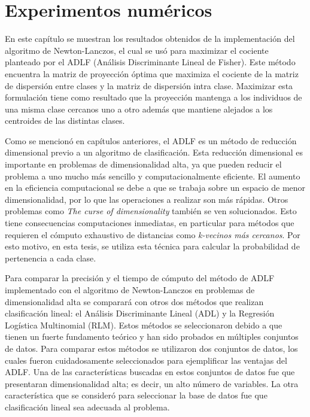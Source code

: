\chapter{Experimentos numéricos}
\label{ch:chapter4}
 
En este capítulo se muestran los resultados obtenidos de la implementación del algoritmo de Newton-Lanczos, el cual se usó para maximizar el cociente planteado por el ADLF (Análisis Discriminante Lineal de Fisher). Este método encuentra la matriz de proyección óptima que maximiza el cociente de la matriz de dispersión entre clases y la matriz de dispersión intra clase. Maximizar esta formulación  tiene como resultado que la proyección mantenga a los individuos de una misma clase cercanos uno a otro además que mantiene alejados a los centroides de las distintas clases. 

Como se mencionó en capítulos anteriores, el ADLF es un método de reducción dimensional previo a un algoritmo de clasificación. Esta reducción dimensional es importante en problemas de dimensionalidad alta, ya que pueden reducir el problema a uno mucho más sencillo y computacionalmente eficiente. El aumento en la eficiencia computacional se debe a que se trabaja sobre un espacio de menor dimensionalidad, por lo que las operaciones a realizar son más rápidas. Otros problemas como \textit{The curse of dimensionality} también se ven solucionados. Esto tiene consecuencias computaciones inmediatas, en particular para métodos que requieren el cómputo exhaustivo de distancias como \textit{k-vecinos más cercanos}. Por esto motivo, en esta tesis, se utiliza esta técnica para calcular la probabilidad de pertenencia a cada clase.

Para comparar la precisión y el tiempo de cómputo del método de ADLF implementado con el algoritmo de Newton-Lanczos en problemas de dimensionalidad alta se comparará con otros dos métodos que realizan clasificación lineal: el Análisis Discriminante Lineal (ADL) y la Regresión Logística Multinomial (RLM). Estos métodos se seleccionaron debido a que tienen un fuerte fundamento teórico y han sido probados en múltiples conjuntos de datos. Para comparar estos métodos se utilizaron dos conjuntos de datos, los cuales fueron cuidadosamente seleccionados para ejemplificar las ventajas del ADLF. Una de las características buscadas en estos conjuntos de datos fue que presentaran dimensionalidad alta; es decir, un alto número de variables. La otra característica que se consideró para seleccionar la base de datos fue que clasificación lineal sea adecuada al problema.


